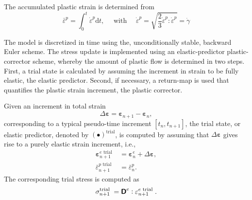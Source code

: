 The accumulated plastic strain is determined from
\begin{equation}
\bar{\varepsilon}^p=\int_{0}^{t} \dot{\varepsilon}^p \mathrm{d} t, \quad \text { with } \quad \dot{\varepsilon}^p=\sqrt{\frac{2}{3} \dot{\varepsilon}^p: \dot{\varepsilon}^p}=\dot{\gamma}
\end{equation}

The model is discretized in time using the, unconditionally stable, backward Euler scheme.
The stress update is implemented using an elastic-predictor plastic-corrector scheme, whereby the amount of plastic flow is determined in two steps.
First, a trial state is calculated by assuming the increment in strain to be fully elastic, the elastic predictor.
Second, if necessary, a return-map is used that quantifies the plastic strain increment, the plastic corrector.

Given an increment in total strain
\begin{equation}
\Delta \bm \varepsilon=\bm\varepsilon_{n+1}-\bm \varepsilon_n,
\end{equation}
corresponding to a typical pseudo-time increment \([t_n, t_{n+1}]\), the trial state, or elastic predictor, denoted by \((\bullet)^\text{trial}\), is computed by assuming that \(\Delta \bm \varepsilon\) gives rise to a purely elastic strain increment, i.e.,
\begin{align}
\bm \varepsilon_{n+1}^{e \text { trial }}&=\bm \varepsilon_{n}^{e}+\Delta \bm \varepsilon, \\
\bar{\varepsilon}_{n+1}^{p \text { trial }}&=\bar{\varepsilon}_{n}^{p}.
\end{align}
The corresponding trial stress is computed as
\begin{equation}
\sigma_{n+1}^{\text {trial }}=\boldsymbol{\mathsf{D}}^{e}: \varepsilon_{n+1}^{e \text { trial }}.
\end{equation}


